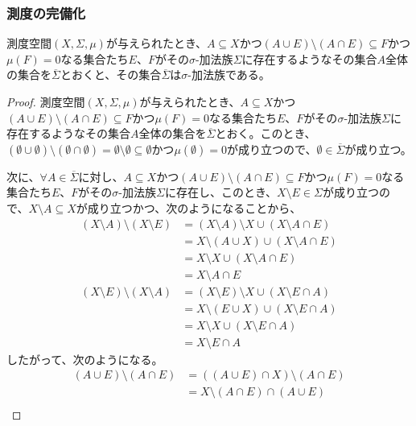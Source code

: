 \documentclass[dvipdfmx]{jsarticle}
\begin{document}
\subsubsection{測度の完備化}%
\begin{thm}\label{4.5.3.18}
測度空間$(X,\varSigma,\mu)$が与えられたとき、$A \subseteq X$かつ$(A \cup E) \setminus (A \cap E) \subseteq F$かつ$\mu(F) = 0$なる集合たち$E$、$F$がその$\sigma$-加法族$\varSigma$に存在するようなその集合$A$全体の集合を$\overline{\varSigma}$とおくと、その集合$\overline{\varSigma}$は$\sigma$-加法族である。
\end{thm}
\begin{proof}
測度空間$(X,\varSigma,\mu)$が与えられたとき、$A \subseteq X$かつ$(A \cup E) \setminus (A \cap E) \subseteq F$かつ$\mu(F) = 0$なる集合たち$E$、$F$がその$\sigma$-加法族$\varSigma$に存在するようなその集合$A$全体の集合を$\overline{\varSigma}$とおく。このとき、$(\emptyset \cup \emptyset) \setminus (\emptyset \cap \emptyset) = \emptyset \setminus \emptyset \subseteq \emptyset$かつ$\mu(\emptyset) = 0$が成り立つので、$\emptyset \in \overline{\varSigma}$が成り立つ。\par
次に、$\forall A \in \overline{\varSigma}$に対し、$A \subseteq X$かつ$(A \cup E) \setminus (A \cap E) \subseteq F$かつ$\mu(F) = 0$なる集合たち$E$、$F$がその$\sigma$-加法族$\varSigma$に存在し、このとき、$X \setminus E \in \varSigma$が成り立つので、$X \setminus A \subseteq X$が成り立つかつ、次のようになることから、
\begin{align*}
(X \setminus A) \setminus (X \setminus E) &= (X \setminus A) \setminus X \cup (X \setminus A \cap E)\\
&= X \setminus (A \cup X) \cup (X \setminus A \cap E)\\
&= X \setminus X \cup (X \setminus A \cap E)\\
&= X \setminus A \cap E\\
(X \setminus E) \setminus (X \setminus A) &= (X \setminus E) \setminus X \cup (X \setminus E \cap A)\\
&= X \setminus (E \cup X) \cup (X \setminus E \cap A)\\
&= X \setminus X \cup (X \setminus E \cap A)\\
&= X \setminus E \cap A
\end{align*}
したがって、次のようになる。
\begin{align*}
(A \cup E) \setminus (A \cap E) &= \left( (A \cup E) \cap X \right) \setminus (A \cap E)\\
&= X \setminus (A \cap E) \cap (A \cup E)\\

\end{align*}
\end{proof}
\end{document}

